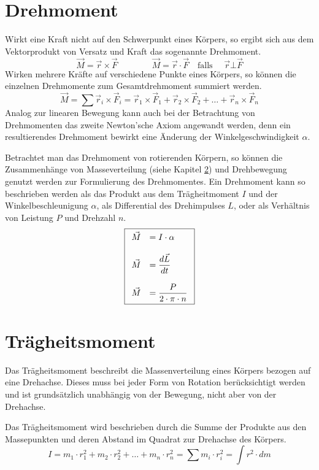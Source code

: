\section{Drehmoment}
Wirkt eine Kraft nicht auf den Schwerpunkt eines Körpers, so ergibt
sich aus dem Vektorprodukt von Versatz und Kraft das sogenannte
Drehmoment.
\[ \boxed{ 
	\vec{M} = \vec{r} \times \vec{F}
		\qquad \qquad
	\vec{M} = \vec{r} \cdot \vec{F}
		\quad \text{falls } \quad \vec{r} \bot \vec{F}
} \]
Wirken mehrere Kräfte auf verschiedene Punkte eines Körpers, so können
die einzelnen Drehmomente zum Gesamtdrehmoment summiert werden.
\[ \boxed{
	\vec{M} = \sum \vec{r}_i \times \vec{F}_i
	= \vec{r}_1 \times \vec{F}_1 
		+ \vec{r}_2 \times \vec{F}_2
		+ \dots 
		+ \vec{r}_n \times \vec{F}_n 
} \]
Analog zur linearen Bewegung kann auch bei der Betrachtung von Drehmomenten
das zweite Newton'sche Axiom angewandt werden, denn ein resultierendes
Drehmoment bewirkt eine Änderung der Winkelgeschwindigkeit $\alpha$.

Betrachtet man das Drehmoment von rotierenden Körpern, so können die
Zusammenhänge von Masseverteilung (siehe Kapitel 
\ref{sec:traegheitsmoment}) und Drehbewegung genutzt werden zur
Formulierung des Drehmomentes. Ein Drehmoment kann so beschrieben werden
als das Produkt aus dem Trägheitmoment $I$ und der Winkelbeschleunigung
$\alpha$, als Differential des Drehimpulses $L$, oder als Verhältnis von 
Leistung $P$ und Drehzahl $n$.
\[ \boxed{\begin{array}{r l}
	\vec{M} & = \displaystyle I \cdot \alpha \\
	& \\
	\vec{M} & = \displaystyle \frac{d\vec{L}}{dt} \\
	& \\
	\vec{M} & = \displaystyle \frac{P}{2 \cdot \pi \cdot n}
\end{array} }\]

\section{Trägheitsmoment}\label{sec:traegheitsmoment}
Das Trägheitsmoment beschreibt die Massenverteilung eines Körpers
bezogen auf eine Drehachse. Dieses muss bei jeder Form von Rotation
berücksichtigt werden und ist grundsätzlich unabhängig von der 
Bewegung, nicht aber von der Drehachse.

Das Trägheitsmoment wird beschrieben durch die Summe der 
Produkte aus den Massepunkten und deren Abstand im Quadrat zur 
Drehachse des Körpers.
\[ \boxed{
	I = m_1 \cdot r_1^2
		+ m_2 \cdot r_2^2 
		+ \dots 
		+ m_n \cdot r_n^2
		= \sum m_i \cdot r_i^2
		= \int r^2 \cdot dm
} \]

